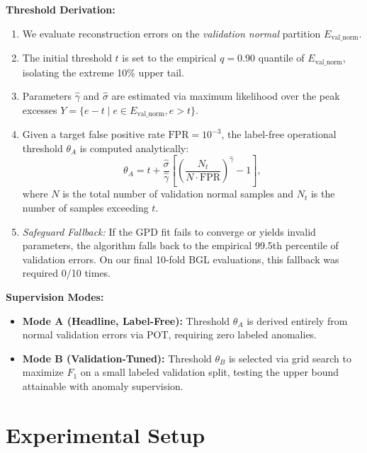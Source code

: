 \documentclass[conference]{IEEEtran}
\begin{document}
\textbf{Threshold Derivation:}
\begin{enumerate}
    \item We evaluate reconstruction errors on the \textit{validation normal} partition $E_{\text{val\_norm}}$.
    \item The initial threshold $t$ is set to the empirical $q = 0.90$ quantile of $E_{\text{val\_norm}}$, isolating the extreme 10\% upper tail.
    \item Parameters $\hat{\gamma}$ and $\hat{\sigma}$ are estimated via maximum likelihood over the peak excesses $Y = \{e - t \mid e \in E_{\text{val\_norm}}, e > t\}$.
    \item Given a target false positive rate $\text{FPR} = 10^{-3}$, the label-free operational threshold $\theta_A$ is computed analytically:
    \begin{equation}
    \theta_A = t + \frac{\hat{\sigma}}{\hat{\gamma}}\left[\left(\frac{N_t}{N \cdot \text{FPR}}\right)^{\hat{\gamma}} - 1\right],
    \end{equation}
    where $N$ is the total number of validation normal samples and $N_t$ is the number of samples exceeding $t$.
    \item \textit{Safeguard Fallback:} If the GPD fit fails to converge or yields invalid parameters, the algorithm falls back to the empirical 99.5th percentile of validation errors. On our final 10-fold BGL evaluations, this fallback was required 0/10 times.
\end{enumerate}

\textbf{Supervision Modes:}
\begin{itemize}
    \item \textbf{Mode A (Headline, Label-Free):} Threshold $\theta_A$ is derived entirely from normal validation errors via POT, requiring zero labeled anomalies.
    \item \textbf{Mode B (Validation-Tuned):} Threshold $\theta_B$ is selected via grid search to maximize $F_1$ on a small labeled validation split, testing the upper bound attainable with anomaly supervision.
\end{itemize}

\section{Experimental Setup}
\label{sec:setup}
\end{document}
